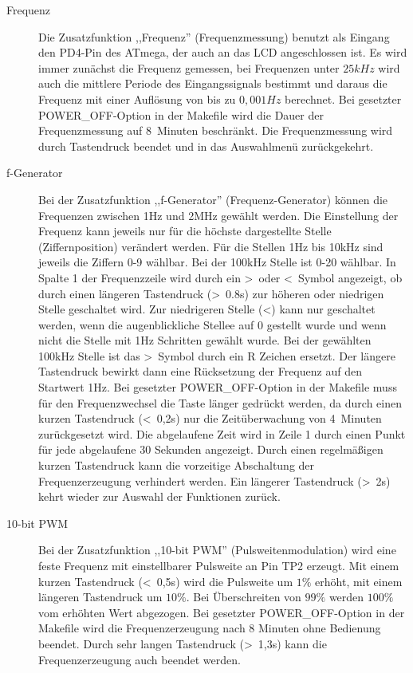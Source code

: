 \begin{description}
 \item[Frequenz]
Die Zusatzfunktion ,,Frequenz'' (Frequenzmessung) benutzt als Eingang den PD4-Pin des ATmega, der auch an das LCD angeschlossen ist.
Es wird immer zunächst die Frequenz gemessen, bei Frequenzen unter \(25kHz\) wird auch die mittlere Periode des Eingangssignals
bestimmt und daraus die Frequenz mit einer Auflösung von bis zu \(0,001Hz\) berechnet.
Bei gesetzter POWER\_OFF-Option in der Makefile wird die Dauer der Frequenzmessung auf 8~Minuten beschränkt.
Die Frequenzmessung wird durch Tastendruck beendet und in das Auswahlmenü zurückgekehrt.\\

 \item[f-Generator]
Bei der Zusatzfunktion ,,f-Generator'' (Frequenz-Generator) können die Frequenzen zwischen 1Hz und 2MHz gewählt werden.
Die Einstellung der Frequenz kann jeweils nur für die höchste dargestellte Stelle (Ziffernposition) verändert werden.
Für die Stellen 1Hz bis 10kHz sind jeweils die Ziffern 0-9 wählbar. Bei der 100kHz Stelle ist 0-20 wählbar.
In Spalte 1 der Frequenzzeile wird durch ein \textgreater~oder \textless~Symbol angezeigt, ob durch einen längeren
Tastendruck (\textgreater~0.8s) zur höheren oder niedrigen Stelle geschaltet wird.
Zur niedrigeren Stelle (\textless) kann nur geschaltet werden, wenn die augenblickliche Stellee auf 0 gestellt wurde
und wenn nicht die Stelle mit 1Hz Schritten gewählt wurde.
Bei der gewählten 100kHz Stelle ist das \textgreater~Symbol durch ein R Zeichen ersetzt. Der längere Tastendruck bewirkt dann eine
Rücksetzung der Frequenz auf den Startwert 1Hz.
Bei gesetzter POWER\_OFF-Option in der Makefile muss für den Frequenzwechsel die Taste länger gedrückt werden, da
durch einen kurzen Tastendruck (\textless~0,2s) nur die Zeitüberwachung von 4~Minuten zurückgesetzt wird.
Die abgelaufene Zeit wird in Zeile 1 durch einen Punkt für jede abgelaufene 30 Sekunden angezeigt.
Durch einen regelmäßigen kurzen Tastendruck kann die vorzeitige Abschaltung der Frequenzerzeugung verhindert werden.
Ein längerer Tastendruck (\textgreater~2s) kehrt wieder zur Auswahl der Funktionen zurück.\\

 \item[10-bit PWM]
Bei der Zusatzfunktion ,,10-bit PWM'' (Pulsweitenmodulation) wird eine feste Frequenz mit einstellbarer Pulsweite an Pin TP2 erzeugt.
Mit einem kurzen Tastendruck (\textless~0,5s) wird die Pulsweite um \(1\%\) erhöht, mit einem längeren Tastendruck um \(10\%\).
Bei Überschreiten von \(99\%\) werden \(100\%\) vom erhöhten Wert abgezogen.
Bei gesetzter POWER\_OFF-Option in der Makefile wird die Frequenzerzeugung nach 8 Minuten ohne Bedienung beendet.
Durch sehr langen Tastendruck (\textgreater~1,3s) kann die Frequenzerzeugung auch beendet werden.\\


\end{description}
